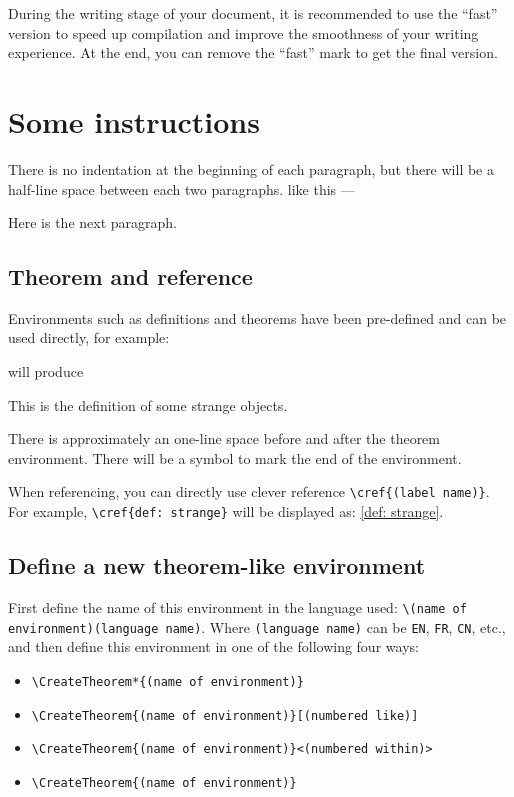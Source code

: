 \documentclass{einfart}
\begin{document}
During the writing stage of your document, it is recommended to use the ``fast'' version to speed up compilation and improve the smoothness of your writing experience. At the end, you can remove the ``fast'' mark to get the final version.

\section{Some instructions}

There is no indentation at the beginning of each paragraph, but there will be a half-line space between each two paragraphs. like this ---

Here is the next paragraph.

\subsection{Theorem and reference}

Environments such as definitions and theorems have been pre-defined and can be used directly, for example:


There is approximately an one-line space before and after the theorem environment. There will be a symbol to mark the end of the environment.

When referencing, you can directly use clever reference \lstinline|\cref{(label name)}|. For example, \lstinline|\cref{def: strange}| will be displayed as: \cref{def: strange}.

\subsection{Define a new theorem-like environment}

First define the name of this environment in the language used: \lstinline|\(name of environment)(language name)|. Where \lstinline|(language name)| can be \lstinline|EN|, \lstinline|FR|, \lstinline|CN|, etc., and then define this environment in one of the following four ways:
\begin{itemize}
    \item \lstinline|\CreateTheorem*{(name of environment)}|
    \item \lstinline|\CreateTheorem{(name of environment)}[(numbered like)]|
    \item \lstinline|\CreateTheorem{(name of environment)}<(numbered within)>|
    \item \lstinline|\CreateTheorem{(name of environment)}|
\end{itemize}
\end{document}
